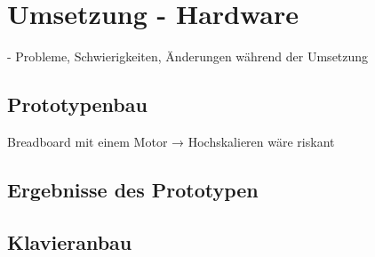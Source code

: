 \chapter{Umsetzung - Hardware} \label{umsetzungHW}

\nocite{*}
- Probleme, Schwierigkeiten, Änderungen während der Umsetzung

\section{Prototypenbau}
Breadboard mit einem Motor → Hochskalieren wäre riskant
\section{Ergebnisse des Prototypen}
\section{Klavieranbau}
